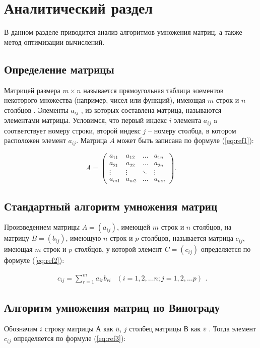 \chapter{Аналитический раздел}
В данном разделе приводится анализ алгоритмов умножения матриц, а также метод оптимизации вычислений.
\section{Определение матрицы}
Матрицей размера $m \times n$ называется прямоугольная таблица элементов некоторого множества 
(например, чисел или функций), имеющая $m$ строк и $n$ столбцов \cite{angem}.
Элементы $a_{ij}$ , из которых составлена матрица, называются элементами матрицы.
Условимся, что первый индекс $i$ элемента $a_{ij}$ a
соответствует номеру строки, второй индекс $j$ – номеру столбца, в котором расположен элемент $a_{ij}$.
Матрица $A$ может быть записана по формуле (\ref{eq:ref1}):

\begin{equation}
	A = \left(
	\begin{array}{cccc}
		a_{11} & a_{12} & \ldots & a_{1n} \\
		a_{21} & a_{22} & \ldots & a_{2n} \\
		\vdots & \vdots & \ddots & \vdots \\
		a_{m1} & a_{m2} & \ldots & a_{mn}
	\end{array}
	\right).
	\label{eq:ref1}
\end{equation}

\section{Стандартный алгоритм умножения матриц}
Произведением матрицы $A = (a_{ij})$, имеющей $m$ строк и $n$ столбцов, на матрицу $B = (b_{ij})$, имеющую
$n$ строк и $p$ столбцов, называется матрица $c_{ij}$, имеющая $m$ строк и $p$ столбцов, у которой элемент 
$C = (c_{ij})$ определяется по формуле (\ref{eq:ref2}):

\begin{equation}
	\begin{array}{cc}
		c_{ij} = \sum\limits_{r=1}^m a_{ir}b_{ri} & (i=1,2,\dots n; j=1,2,\dots p)
	\end{array}.
	\label{eq:ref2}
\end{equation}

\section{Алгоритм умножения матриц по Винограду}
Обозначим $i$ строку матрицы $А$ как  $\overline{u}$, $j$ столбец матрицы $В$ как $\overline{v}$ \cite{winograd-origin}. Тогда элемент $c_{ij}$ определяется по формуле (\ref{eq:ref3}):

